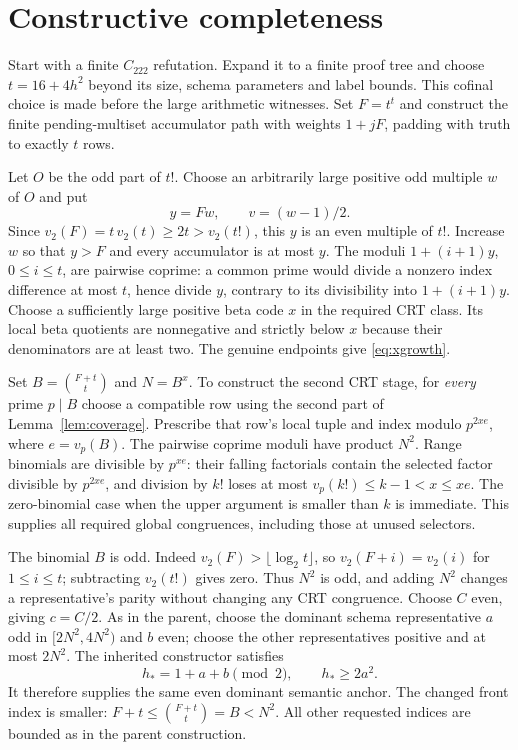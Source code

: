 \documentclass[11pt]{article}
\begin{document}
\section{Constructive completeness}\label{sec:complete}

Start with a finite $C_{222}$ refutation. Expand it to a finite proof tree
and choose $t=16+4h^2$ beyond its size, schema parameters and label bounds.
This cofinal choice is made before the large arithmetic witnesses. Set
$F=t^t$ and construct the finite pending-multiset accumulator path with
weights $1+jF$, padding with truth to exactly $t$ rows.

Let $O$ be the odd part of $t!$. Choose an arbitrarily large positive odd
multiple $w$ of $O$ and put
\[
 y=Fw,\qquad v=(w-1)/2.
\]
Since $v_2(F)=t\,v_2(t)\ge2t>v_2(t!)$, this $y$ is an even multiple
of $t!$. Increase $w$ so that $y>F$ and every accumulator is at most $y$.
The moduli $1+(i+1)y$, $0\le i\le t$, are pairwise coprime: a common
prime would divide a nonzero index difference at most $t$, hence divide
$y$, contrary to its divisibility into $1+(i+1)y$. Choose a sufficiently
large positive beta code $x$ in the required CRT class. Its local beta
quotients are nonnegative and strictly below $x$ because their denominators
are at least two. The genuine endpoints give \eqref{eq:xgrowth}.

Set $B=\binom{F+t}{t}$ and $N=B^x$. To construct the second CRT stage,
for \emph{every} prime $p\mid B$ choose a compatible row using the second
part of Lemma~\ref{lem:coverage}. Prescribe that row's local tuple and
index modulo $p^{2xe}$, where $e=v_p(B)$. The pairwise coprime moduli have
product $N^2$. Range binomials are divisible by $p^{xe}$: their falling
factorials contain the selected factor divisible by $p^{2xe}$, and division
by $k!$ loses at most $v_p(k!)\le k-1<x\le xe$. The zero-binomial case
when the upper argument is smaller than $k$ is immediate. This supplies
all required global congruences, including those at unused selectors.

The binomial $B$ is odd. Indeed $v_2(F)>\lfloor\log_2t\rfloor$, so
$v_2(F+i)=v_2(i)$ for $1\le i\le t$; subtracting $v_2(t!)$ gives zero.
Thus $N^2$ is odd, and adding $N^2$ changes a representative's parity
without changing any CRT congruence. Choose $C$ even, giving $c=C/2$.
As in the parent, choose the dominant schema representative $a$ odd in
$[2N^2,4N^2)$ and $b$ even; choose the other representatives positive and
at most $2N^2$. The inherited constructor satisfies
\[
 h_*=1+a+b\pmod2,\qquad h_*\ge2a^2.
\]
It therefore supplies the same even dominant semantic anchor.
The changed front index is smaller: $F+t\le\binom{F+t}{t}=B<N^2$.
All other requested indices are bounded as in the parent construction.
\end{document}
